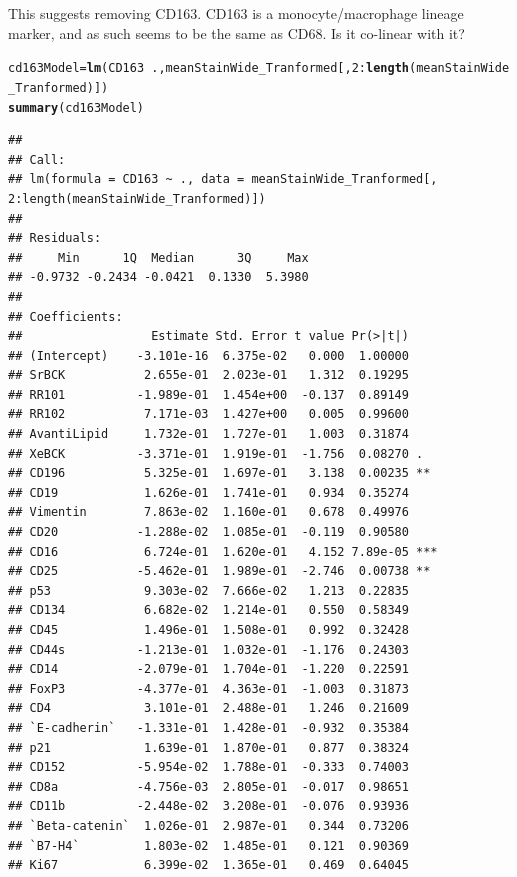 \documentclass[a4paper]{article}\usepackage[]{graphicx}\usepackage[]{color}
\makeatletter
\newcommand{\hlnum}[1]{\textcolor[rgb]{0.686,0.059,0.569}{#1}}%
\newcommand{\hlopt}[1]{\textcolor[rgb]{0,0,0}{#1}}%
\newcommand{\hlstd}[1]{\textcolor[rgb]{0.345,0.345,0.345}{#1}}%
\newcommand{\hlkwb}[1]{\textcolor[rgb]{0.69,0.353,0.396}{#1}}%
\newcommand{\hlkwd}[1]{\textcolor[rgb]{0.737,0.353,0.396}{\textbf{#1}}}%
\newenvironment{kframe}{%
 \def\at@end@of@kframe{}%
 \ifinner\ifhmode%
  \def\at@end@of@kframe{\end{minipage}}%
  \begin{minipage}{\columnwidth}%
 \fi\fi%
 \def\FrameCommand##1{\hskip\@totalleftmargin \hskip-\fboxsep
 \colorbox{shadecolor}{##1}\hskip-\fboxsep
     \hskip-\linewidth \hskip-\@totalleftmargin \hskip\columnwidth}%
 \MakeFramed {\advance\hsize-\width
   \@totalleftmargin\z@ \linewidth\hsize
   \@setminipage}}%
 {\par\unskip\endMakeFramed%
 \at@end@of@kframe}
\newenvironment{knitrout}{}{} %
\makeatother
\begin{document}
This suggests removing CD163. CD163 is a monocyte/macrophage lineage marker, and as such seems to be the same as CD68. Is it co-linear with it?
\begin{knitrout}
\color{fgcolor}\begin{kframe}
\begin{alltt}
\hlstd{cd163Model} \hlkwb{=} \hlkwd{lm}\hlstd{(CD163}\hlopt{~}\hlstd{.,meanStainWide_Tranformed[,}\hlnum{2}\hlopt{:}\hlkwd{length}\hlstd{(meanStainWide_Tranformed)])}
\hlkwd{summary}\hlstd{(cd163Model)}
\end{alltt}
\begin{verbatim}
## 
## Call:
## lm(formula = CD163 ~ ., data = meanStainWide_Tranformed[, 2:length(meanStainWide_Tranformed)])
## 
## Residuals:
##     Min      1Q  Median      3Q     Max 
## -0.9732 -0.2434 -0.0421  0.1330  5.3980 
## 
## Coefficients:
##                  Estimate Std. Error t value Pr(>|t|)    
## (Intercept)    -3.101e-16  6.375e-02   0.000  1.00000    
## SrBCK           2.655e-01  2.023e-01   1.312  0.19295    
## RR101          -1.989e-01  1.454e+00  -0.137  0.89149    
## RR102           7.171e-03  1.427e+00   0.005  0.99600    
## AvantiLipid     1.732e-01  1.727e-01   1.003  0.31874    
## XeBCK          -3.371e-01  1.919e-01  -1.756  0.08270 .  
## CD196           5.325e-01  1.697e-01   3.138  0.00235 ** 
## CD19            1.626e-01  1.741e-01   0.934  0.35274    
## Vimentin        7.863e-02  1.160e-01   0.678  0.49976    
## CD20           -1.288e-02  1.085e-01  -0.119  0.90580    
## CD16            6.724e-01  1.620e-01   4.152 7.89e-05 ***
## CD25           -5.462e-01  1.989e-01  -2.746  0.00738 ** 
## p53             9.303e-02  7.666e-02   1.213  0.22835    
## CD134           6.682e-02  1.214e-01   0.550  0.58349    
## CD45            1.496e-01  1.508e-01   0.992  0.32428    
## CD44s          -1.213e-01  1.032e-01  -1.176  0.24303    
## CD14           -2.079e-01  1.704e-01  -1.220  0.22591    
## FoxP3          -4.377e-01  4.363e-01  -1.003  0.31873    
## CD4             3.101e-01  2.488e-01   1.246  0.21609    
## `E-cadherin`   -1.331e-01  1.428e-01  -0.932  0.35384    
## p21             1.639e-01  1.870e-01   0.877  0.38324    
## CD152          -5.954e-02  1.788e-01  -0.333  0.74003    
## CD8a           -4.756e-03  2.805e-01  -0.017  0.98651    
## CD11b          -2.448e-02  3.208e-01  -0.076  0.93936    
## `Beta-catenin`  1.026e-01  2.987e-01   0.344  0.73206    
## `B7-H4`         1.803e-02  1.485e-01   0.121  0.90369    
## Ki67            6.399e-02  1.365e-01   0.469  0.64045    

\end{verbatim}
\end{kframe}
\end{knitrout}
\end{document}
